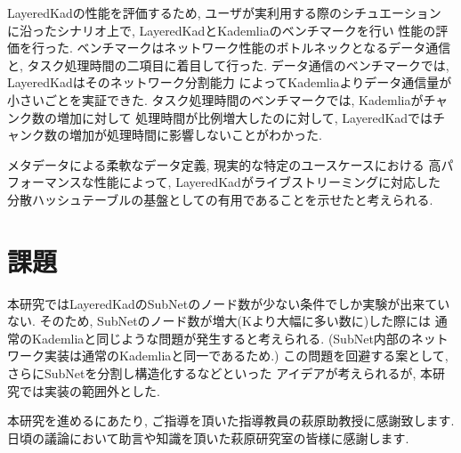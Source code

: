 \documentclass[sotsuron]{jcsie}
\begin{document}
LayeredKadの性能を評価するため, ユーザが実利用する際のシチュエーション
に沿ったシナリオ上で, LayeredKadとKademliaのベンチマークを行い
性能の評価を行った.
ベンチマークはネットワーク性能のボトルネックとなるデータ通信と, 
タスク処理時間の二項目に着目して行った.
データ通信のベンチマークでは, LayeredKadはそのネットワーク分割能力
によってKademliaよりデータ通信量が小さいごとを実証できた.
タスク処理時間のベンチマークでは, Kademliaがチャンク数の増加に対して
処理時間が比例増大したのに対して, 
LayeredKadではチャンク数の増加が処理時間に影響しないことがわかった.

メタデータによる柔軟なデータ定義, 現実的な特定のユースケースにおける
高パフォーマンスな性能によって, LayeredKadがライブストリーミングに対応した
分散ハッシュテーブルの基盤としての有用であることを示せたと考えられる.

\section{課題}
本研究ではLayeredKadのSubNetのノード数が少ない条件でしか実験が出来ていない.
そのため, SubNetのノード数が増大(Kより大幅に多い数に)した際には
通常のKademliaと同じような問題が発生すると考えられる.
(SubNet内部のネットワーク実装は通常のKademliaと同一であるため.)
この問題を回避する案として, さらにSubNetを分割し構造化するなどといった
アイデアが考えられるが, 本研究では実装の範囲外とした.

\begin{acknowledgment}
	本研究を進めるにあたり, ご指導を頂いた指導教員の萩原助教授に感謝致します.
	日頃の議論において助言や知識を頂いた萩原研究室の皆様に感謝します.
\end{acknowledgment}



\end{document}
